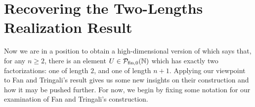 \section{Recovering the Two-Lengths Realization Result} \label{sec:recovering length sets}
%
%
%
%
%	
%	

Now we are in a position to obtain a high-dimensional version of \cite[Proposition 4.10]{fan-tringali18} which says that, for any $n\ge 2$, there is an element $U\in {\mathcal{P}_{\textrm{fin},0}(\mathbb{N})}$ which has exactly two factorizations: one of length $2$, and one of length $n+1$.
Applying our viewpoint to Fan and Tringali's result gives us some new insights on their construction and how it may be pushed further.
For now, we begin by fixing some notation for our examination of Fan and Tringali's construction.

